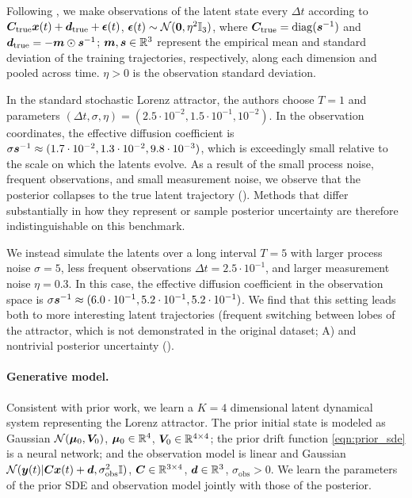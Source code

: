 Following \citet{li2020scalable}, we make observations of the latent state every $\Delta t$ according to $\boldsymbol{C}_{\mathrm{true}} \boldsymbol{x}(t) + \boldsymbol{d}_{\mathrm{true}} + \boldsymbol{\epsilon}(t)$, $\boldsymbol{\epsilon}(t) \sim \mathcal{N}(\boldsymbol{0}, \eta^2 \mathbb{I}_3)$, where $\boldsymbol{C}_{\mathrm{true}} = \mathrm{diag}(\boldsymbol{s}^{-1})$ and $\boldsymbol{d}_{\mathrm{true}} = - \boldsymbol{m} \odot \boldsymbol{s}^{-1}$; $\boldsymbol{m}, \boldsymbol{s} \in \mathbb{R}^3$ represent the empirical mean and standard deviation of the training trajectories, respectively, along each dimension and pooled across time. 
$\eta > 0$ is the observation standard deviation.

In the standard stochastic Lorenz attractor, the authors choose $T = 1$ and parameters $(\Delta t, \sigma, \eta) = (2.5 \cdot 10^{-2}, 1.5 \cdot 10^{-1}, 10^{-2})$. 
In the observation coordinates, the effective diffusion coefficient is $\sigma \boldsymbol{s}^{-1} \approx (1.7 \cdot 10^{-2}, 1.3 \cdot 10^{-2}, 9.8 \cdot 10^{-3})$, which is exceedingly small relative to the scale on which the latents evolve. 
As a result of the small process noise, frequent observations, and small measurement noise, we observe that the posterior collapses to the true latent trajectory (). 
Methods that differ substantially in how they represent or sample posterior uncertainty are therefore indistinguishable on this benchmark. 

We instead simulate the latents over a long interval $T = 5$ with larger process noise $\sigma = 5$, less frequent observations $\Delta t = 2.5 \cdot 10^{-1}$, and larger measurement noise $\eta = 0.3$. 
In this case, the effective diffusion coefficient in the observation space is $\sigma \boldsymbol{s}^{-1} \approx (6.0 \cdot 10^{-1}, 5.2 \cdot 10^{-1}, 5.2 \cdot 10^{-1})$. 
We find that this setting leads both to more interesting latent trajectories (frequent switching between lobes of the attractor, which is not demonstrated in the original dataset; A) and nontrivial posterior uncertainty (). 

\paragraph{Generative model.}
Consistent with prior work, we learn a $K = 4$ dimensional latent dynamical system representing the Lorenz attractor. 
The prior initial state is modeled as Gaussian $\mathcal{N}(\boldsymbol{\mu}_0, \boldsymbol{V}_0)$, $\boldsymbol{\mu}_0 \in \mathbb{R}^4$, $\boldsymbol{V}_0 \in \mathbb{R}^{4 \times 4}$; the prior drift function \cref{eqn:prior_sde} is a neural network; and the observation model is linear and Gaussian $\mathcal{N}(\boldsymbol{y}(t) | \boldsymbol{C} \boldsymbol{x}(t) + \boldsymbol{d}, \sigma_{\mathrm{obs}}^2 \mathbb{I})$, $\boldsymbol{C} \in \mathbb{R}^{3 \times 4}$, $\boldsymbol{d} \in \mathbb{R}^3$, $\sigma_{\mathrm{obs}} > 0$.
We learn the parameters of the prior SDE and observation model jointly with those of the posterior.

